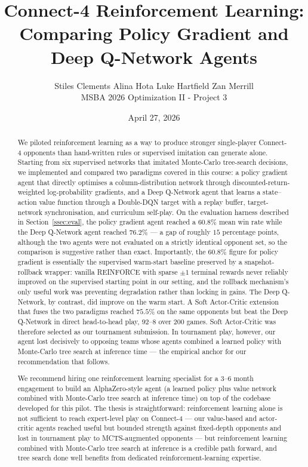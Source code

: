 \documentclass[11pt]{article}
\title{%
  Connect-4 Reinforcement Learning: \\
  \large Comparing Policy Gradient and Deep Q-Network Agents
}
\author{%
  Stiles Clements \quad Alina Hota \quad Luke Hartfield \quad Zan Merrill \\[0.6em]
  \normalsize MSBA 2026 Optimization II - Project 3
}
\date{April 27, 2026}
\begin{document}
\maketitle

\begin{abstract}
We piloted reinforcement learning as a way to produce stronger
single-player Connect-4 opponents than hand-written rules or
supervised imitation can generate alone. Starting from six supervised
networks that imitated Monte-Carlo tree-search decisions, we
implemented and compared two paradigms covered in this course: a
policy gradient agent that directly optimises a column-distribution
network through discounted-return-weighted log-probability gradients,
and a Deep Q-Network agent that learns a state--action value function
through a Double-DQN target with a replay buffer, target-network
synchronisation, and curriculum self-play. On the evaluation harness
described in Section~\ref{ssec:eval}, the policy gradient agent
reached a $60.8\%$ mean win rate while the Deep Q-Network agent
reached $76.2\%$ --- a gap of roughly $15$ percentage points, although
the two agents were not evaluated on a strictly identical opponent
set, so the comparison is suggestive rather than exact.
Importantly, the $60.8\%$ figure for policy gradient is essentially
the supervised warm-start baseline preserved by a snapshot-rollback
wrapper: vanilla REINFORCE with sparse $\pm 1$ terminal rewards never
reliably improved on the supervised starting point in our setting,
and the rollback mechanism's only useful work was preventing
degradation rather than locking in gains. The Deep Q-Network, by
contrast, did improve on the warm start.
A Soft Actor-Critic extension that fuses the two paradigms reached
$75.5\%$ on the same opponents but beat the Deep Q-Network in direct
head-to-head play, $92$--$8$ over $200$ games. Soft Actor-Critic was
therefore selected as our tournament submission. In tournament play,
however, our agent lost decisively to opposing teams whose agents
combined a learned policy with Monte-Carlo tree search at inference
time --- the empirical anchor for our recommendation that follows.

We recommend hiring one reinforcement learning specialist for a 3--6
month engagement to build an AlphaZero-style agent (a learned policy
plus value network combined with Monte-Carlo tree search at inference
time) on top of the codebase developed for this pilot. The thesis is
straightforward: reinforcement learning alone is not sufficient to
reach expert-level play on Connect-4 --- our value-based and
actor-critic agents reached useful but bounded strength against
fixed-depth opponents and lost in tournament play to MCTS-augmented
opponents --- but reinforcement learning combined with Monte-Carlo
tree search at inference is a credible path forward, and tree search
done well benefits from dedicated reinforcement-learning expertise.
\end{abstract}
\end{document}
